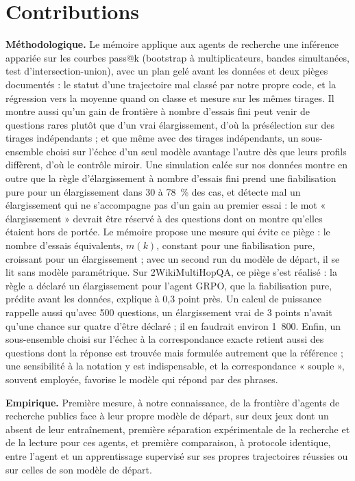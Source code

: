\section{Contributions}
\textbf{Méthodologique.} Le mémoire applique aux agents de recherche une inférence appariée sur les courbes pass@k (bootstrap à multiplicateurs, bandes simultanées, test d'intersection-union), avec un plan gelé avant les données et deux pièges documentés : le statut d'une trajectoire mal classé par notre propre code, et la régression vers la moyenne quand on classe et mesure sur les mêmes tirages. Il montre aussi qu'un gain de frontière à nombre d'essais fini peut venir de questions rares plutôt que d'un vrai élargissement, d'où la présélection sur des tirages indépendants ; et que même avec des tirages indépendants, un sous-ensemble choisi sur l'échec d'un seul modèle avantage l'autre dès que leurs profils diffèrent, d'où le contrôle miroir. Une simulation calée sur nos données montre en outre que la règle d'élargissement à nombre d'essais fini prend une fiabilisation pure pour un élargissement dans 30 à 78~\% des cas, et détecte mal un élargissement qui ne s'accompagne pas d'un gain au premier essai : le mot « élargissement » devrait être réservé à des questions dont on montre qu'elles étaient hors de portée. Le mémoire propose une mesure qui évite ce piège : le nombre d'essais équivalents, $m(k)$, constant pour une fiabilisation pure, croissant pour un élargissement ; avec un second run du modèle de départ, il se lit sans modèle paramétrique. Sur 2WikiMultiHopQA, ce piège s'est réalisé : la règle a déclaré un élargissement pour l'agent GRPO, que la fiabilisation pure, prédite avant les données, explique à 0,3 point près. Un calcul de puissance rappelle aussi qu'avec 500 questions, un élargissement vrai de 3 points n'avait qu'une chance sur quatre d'être déclaré ; il en faudrait environ 1~800. Enfin, un sous-ensemble choisi sur l'échec à la correspondance exacte retient aussi des questions dont la réponse est trouvée mais formulée autrement que la référence ; une sensibilité à la notation y est indispensable, et la correspondance « souple », souvent employée, favorise le modèle qui répond par des phrases.

\textbf{Empirique.} Première mesure, à notre connaissance, de la frontière d'agents de recherche publics face à leur propre modèle de départ, sur deux jeux dont un absent de leur entraînement, première séparation expérimentale de la recherche et de la lecture pour ces agents, et première comparaison, à protocole identique, entre l'agent et un apprentissage supervisé sur ses propres trajectoires réussies ou sur celles de son modèle de départ.

